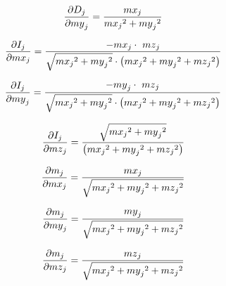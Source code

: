 \begin{equation} \label{eq:sphere24}
\centering
\frac{\partial D_j}{\partial{my}_j}=\frac{{mx}_j}{{{mx}_j}^2+{{my}_j}^2}
\end{equation}

\begin{equation} \label{eq:sphere25}
\centering
\frac{\partial I_j}{\partial{mx}_j}=\frac{-{mx}_j\cdot \ {mz}_j}{\sqrt{{{mx}_j}^2+{{my}_j}^2}\cdot \left({{mx}_j}^2+{{my}_j}^2+{{mz}_j}^2\right)}
\end{equation}

\begin{equation} \label{eq:sphere26}
\centering
\frac{\partial I_j}{\partial{my}_j}=\frac{-{my}_j\cdot \ {mz}_j}{\sqrt{{{mx}_j}^2+{{my}_j}^2}\cdot \left({{mx}_j}^2+{{my}_j}^2+{{mz}_j}^2\right)}
\end{equation}

\begin{equation} \label{eq:sphere27}
\centering
\frac{\partial I_j}{\partial{mz}_j}=\frac{\sqrt{{{mx}_j}^2+{{my}_j}^2}}{\left({{mx}_j}^2+{{my}_j}^2+{{mz}_j}^2\right)}
\end{equation}

\begin{equation} \label{eq:sphere28}
\centering
\frac{\partial m_j}{\partial{mx}_j}=\frac{{mx}_j}{ \sqrt{{{mx}_j}^2+{{my}_j}^2+{{mz}_j}^2} }
\end{equation}

\begin{equation} \label{eq:sphere29}
\centering
\frac{\partial m_j}{\partial{my}_j}=\frac{{my}_j}{ \sqrt{{{mx}_j}^2+{{my}_j}^2+{{mz}_j}^2} }
\end{equation}

\begin{equation} \label{eq:sphere30}
\centering
\frac{\partial m_j}{\partial{mz}_j}=\frac{{mz}_j}{ \sqrt{{{mx}_j}^2+{{my}_j}^2+{{mz}_j}^2} }
\end{equation}